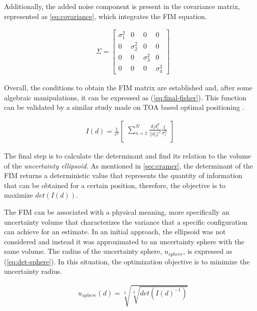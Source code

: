 Additionally, the added noise component is present in the covariance matrix, represented as \ref{eq:covariance}, which integrates the FIM equation.

\begin{eqnarray}
	& \Sigma = 
	\begin{bmatrix}
		\sigma_1^2 & 0 & 0 & 0 \\
		0 & \sigma_2^2 & 0 & 0 \\
		0 & 0  & \sigma_3^2  & 0 \\
		0 & 0 & 0 & \sigma_4^2 
	\end{bmatrix}
	\label{eq:covariance}
\end{eqnarray}

Overall, the conditions to obtain the FIM matrix are established and, after some algebraic manipulations, it can be expressed as (\ref{eq:final-fisher}). This function can be validated by a similar study made on TOA based optimal positioning \cite{cramer-bruno}.

\begin{eqnarray}
	I(d) = \frac{1}{c^2} 
	\begin{bmatrix}
		\sum_{n=1}^{N} \frac{d_i d_i^T}{||d_i||^2} \frac{1}{\sigma_i^2}\\
	\end{bmatrix}
	\label{eq:final-fisher}
\end{eqnarray}

The final step is to calculate the determinant and find its relation to the volume of the \textit{uncertainty ellipsoid}. As mentioned in \ref{sec:cramer}, the determinant of the FIM returns a deterministic value that represents the quantity of information that can be obtained for a certain position, therefore, the objective is to maximize $det(I(d))$.

The FIM can be associated with a physical meaning, more specifically an uncertainty volume that characterizes the variance that a specific configuration can achieve for an estimate. In an initial approach, the ellipsoid was not considered and instead it was approximated to an uncertainty sphere with the same volume. The radius of the uncertainty sphere, $u_{sphere}$, is expressed as (\ref{eq:det-sphere}). In this situation, the optimization objective is to minimize the uncertainty radius.

\begin{eqnarray}
	& u_{sphere}(d) = \sqrt[2]{\sqrt[3]{det(I(d)^{-1})}}
	\label{eq:det-sphere}
\end{eqnarray}

